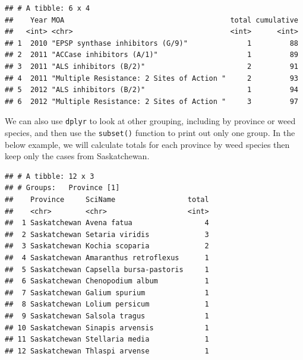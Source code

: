 \documentclass[letterpaper,]{book}
\newenvironment{Shaded}{\begin{snugshade}}{\end{snugshade}}
\newcommand{\DataTypeTok}[1]{\textcolor[rgb]{0.13,0.29,0.53}{#1}}
\newcommand{\KeywordTok}[1]{\textcolor[rgb]{0.13,0.29,0.53}{\textbf{#1}}}
\newcommand{\NormalTok}[1]{#1}
\newcommand{\OperatorTok}[1]{\textcolor[rgb]{0.81,0.36,0.00}{\textbf{#1}}}
\newcommand{\StringTok}[1]{\textcolor[rgb]{0.31,0.60,0.02}{#1}}
\begin{document}
\begin{verbatim}
## # A tibble: 6 x 4
##    Year MOA                                       total cumulative
##   <int> <chr>                                     <int>      <int>
## 1  2010 "EPSP synthase inhibitors (G/9)"              1         88
## 2  2011 "ACCase inhibitors (A/1)"                     1         89
## 3  2011 "ALS inhibitors (B/2)"                        2         91
## 4  2011 "Multiple Resistance: 2 Sites of Action "     2         93
## 5  2012 "ALS inhibitors (B/2)"                        1         94
## 6  2012 "Multiple Resistance: 2 Sites of Action "     3         97
\end{verbatim}

We can also use \texttt{dplyr} to look at other grouping, including by province or weed species, and then use the \texttt{subset()} function to print out only one group. In the below example, we will calculate totals for each province by weed species then keep only the cases from Saskatchewan.

\begin{Shaded}
\end{Shaded}

\begin{verbatim}
## # A tibble: 12 x 3
## # Groups:   Province [1]
##    Province     SciName                 total
##    <chr>        <chr>                   <int>
##  1 Saskatchewan Avena fatua                 4
##  2 Saskatchewan Setaria viridis             3
##  3 Saskatchewan Kochia scoparia             2
##  4 Saskatchewan Amaranthus retroflexus      1
##  5 Saskatchewan Capsella bursa-pastoris     1
##  6 Saskatchewan Chenopodium album           1
##  7 Saskatchewan Galium spurium              1
##  8 Saskatchewan Lolium persicum             1
##  9 Saskatchewan Salsola tragus              1
## 10 Saskatchewan Sinapis arvensis            1
## 11 Saskatchewan Stellaria media             1
## 12 Saskatchewan Thlaspi arvense             1
\end{verbatim}
\end{document}
